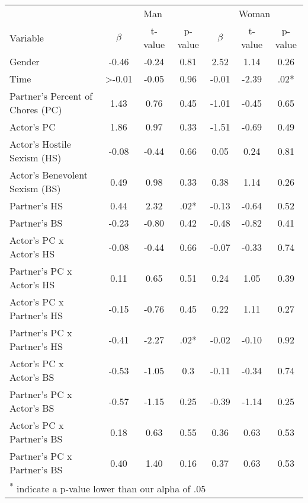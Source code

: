 \documentclass[
  english,
  man]{apa6}
\begin{document}
\begin{table}[tbp]
\begin{center}
\begin{threeparttable}
\end{threeparttable}
\end{center}

\end{table}

\begin{tabular}{lcccccc}
\toprule
\multicolumn{1}{c}{ } & \multicolumn{3}{c}{Man} & \multicolumn{3}{c}{Woman} \\
\cmidrule(l{3pt}r{3pt}){2-4} \cmidrule(l{3pt}r{3pt}){5-7}
Variable & $\beta$ & t-value & p-value & $\beta$ & t-value & p-value\\
\midrule
Gender & -0.46 & -0.24 & 0.81 & 2.52 & 1.14 & 0.26\\
Time & >-0.01 & -0.05 & 0.96 & -0.01 & -2.39 & .02*\\
Partner's Percent of Chores (PC) & 1.43 & 0.76 & 0.45 & -1.01 & -0.45 & 0.65\\
Actor's PC & 1.86 & 0.97 & 0.33 & -1.51 & -0.69 & 0.49\\
Actor's Hostile Sexism (HS) & -0.08 & -0.44 & 0.66 & 0.05 & 0.24 & 0.81\\
\addlinespace
Actor's Benevolent Sexism (BS) & 0.49 & 0.98 & 0.33 & 0.38 & 1.14 & 0.26\\
Partner's HS & 0.44 & 2.32 & .02* & -0.13 & -0.64 & 0.52\\
Partner's BS & -0.23 & -0.80 & 0.42 & -0.48 & -0.82 & 0.41\\
Actor's PC x Actor's HS & -0.08 & -0.44 & 0.66 & -0.07 & -0.33 & 0.74\\
Partner's PC x Actor's HS & 0.11 & 0.65 & 0.51 & 0.24 & 1.05 & 0.39\\
\addlinespace
Actor's PC x Partner's HS & -0.15 & -0.76 & 0.45 & 0.22 & 1.11 & 0.27\\
Partner's PC x Partner's HS & -0.41 & -2.27 & .02* & -0.02 & -0.10 & 0.92\\
Actor's PC x Actor's BS & -0.53 & -1.05 & 0.3 & -0.11 & -0.34 & 0.74\\
Partner's PC x Actor's BS & -0.57 & -1.15 & 0.25 & -0.39 & -1.14 & 0.25\\
Actor's PC x Partner's BS & 0.18 & 0.63 & 0.55 & 0.36 & 0.63 & 0.53\\
\addlinespace
Partner's PC x Partner's BS & 0.40 & 1.40 & 0.16 & 0.37 & 0.63 & 0.53\\
\bottomrule
\multicolumn{7}{l}{\textsuperscript{*} indicate a p-value lower than our alpha of .05}\\
\end{tabular}
\end{document}
